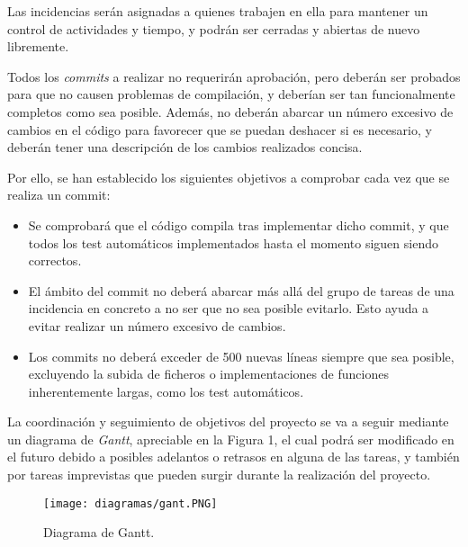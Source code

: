\documentclass[11pt, a4paper, titlepage]{article}
\begin{document}
    Las incidencias serán asignadas a quienes trabajen en ella para mantener un control de actividades y tiempo, y podrán ser cerradas y abiertas de nuevo libremente.

    \item Todos los \textit{commits} a realizar no requerirán aprobación, pero deberán ser probados para que no causen problemas de compilación, y deberían ser tan funcionalmente completos como sea posible. Además, no deberán abarcar un número excesivo de cambios en el código para favorecer que se puedan deshacer si es necesario, y deberán tener una descripción de los cambios realizados concisa.

    Por ello, se han establecido los siguientes objetivos a comprobar cada vez que se realiza un commit:
    \begin{itemize}
        \item Se comprobará que el código compila tras implementar dicho commit, y que todos los test automáticos implementados hasta el momento siguen siendo correctos.
        \item El ámbito del commit no deberá abarcar más allá del grupo de tareas de una incidencia en concreto a no ser que no sea posible evitarlo. Esto ayuda a evitar realizar un número excesivo de cambios.
        \item Los commits no deberá exceder de 500 nuevas líneas siempre que sea posible, excluyendo la subida de ficheros o implementaciones de funciones inherentemente largas, como los test automáticos.
    \end{itemize}



La coordinación y seguimiento de objetivos del proyecto se va a seguir mediante un diagrama de \textit{Gantt}, apreciable en la Figura 1, el cual podrá ser modificado en el futuro debido a posibles adelantos o retrasos en alguna de las tareas, y también por tareas imprevistas que pueden surgir durante la realización del proyecto.\\

\begin{landscape}
    \pagestyle{empty}
    \begin{figure}[!p]
    \centering
    \texttt{[image: diagramas/gant.PNG]}
    \caption{Diagrama de Gantt.}
    \label{fig:my_label}
\end{figure}
\end{landscape}
\end{document}
